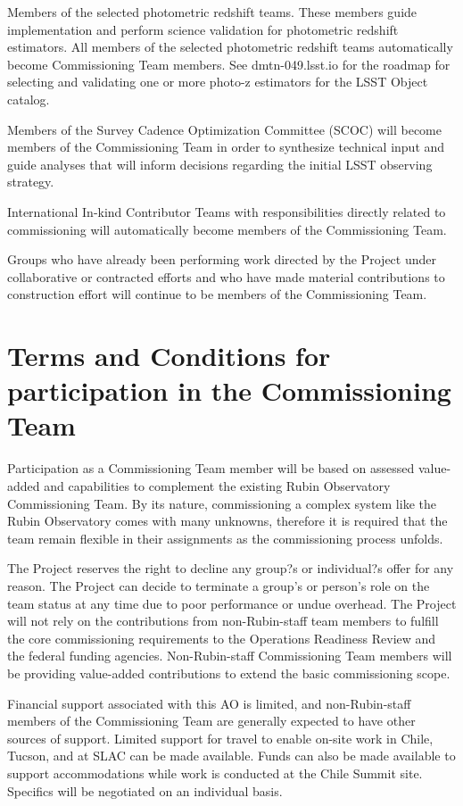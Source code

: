 \documentclass[SE,authoryear,toc]{lsstdoc}
\begin{document}
Members of the selected photometric redshift teams. These members guide implementation and perform science validation for photometric redshift estimators. All members of the selected photometric redshift teams automatically become Commissioning Team members. See dmtn-049.lsst.io for the roadmap for selecting and validating one or more photo-z estimators for the LSST Object catalog.  

Members of the Survey Cadence Optimization Committee (SCOC) will become members of the Commissioning Team in order to synthesize technical input and guide analyses that will inform decisions regarding the initial LSST observing strategy. 

International In-kind Contributor Teams with responsibilities directly related to commissioning will automatically become members of the Commissioning Team.

Groups who have already been performing work directed by the Project under collaborative or contracted efforts and who have made material contributions to construction effort will continue to be members of the Commissioning Team. 

\section{Terms and Conditions for participation in the Commissioning Team}

Participation as a Commissioning Team member will be based on assessed value-added and capabilities to complement the existing Rubin Observatory Commissioning Team. By its nature, commissioning a complex system like the Rubin Observatory comes with many unknowns, therefore it is required that the team remain flexible in their assignments as the commissioning process unfolds. 

The Project reserves the right to decline any group?s or individual?s offer for any reason.   The Project can decide to terminate a group's or person's role on the team status at any time due to poor performance or undue overhead. The Project will not rely on the contributions from non-Rubin-staff team members to fulfill the core commissioning requirements to the Operations Readiness Review and the federal funding agencies. Non-Rubin-staff Commissioning Team members will be providing value-added contributions to extend the basic commissioning scope.

Financial support associated with this AO is limited, and non-Rubin-staff members of the Commissioning Team are generally expected to have other sources of support. Limited support for travel to enable on-site work in Chile, Tucson, and at SLAC can be made available.  Funds can also be made available to support accommodations while work is conducted at the Chile Summit site. Specifics will be negotiated on an individual basis.
\end{document}

